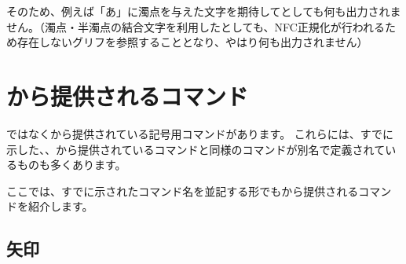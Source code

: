 \documentclass[uplatex, dvipdfmx, paper=a4paper, line_length=45zw, head_space=7zw, foot_space=10zw]{jlreq}
\begin{document}
そのため、例えば「あ」に濁点を与えた文字を期待してとしても何も出力されません。（濁点・半濁点の結合文字を利用したとしても、NFC正規化が行われるため存在しないグリフを参照することとなり、やはり何も出力されません）

\newpage
\section{\texorpdfstring{}{otfパッケージ}から提供されるコマンド}

ではなくから提供されている記号用コマンドがあります。
これらには、すでに示した、、から提供されているコマンドと同様のコマンドが別名で定義されているものも多くあります。

ここでは、すでに示されたコマンド名を並記する形でもから提供されるコマンドを紹介します。

\subsection{矢印}
\end{document}
